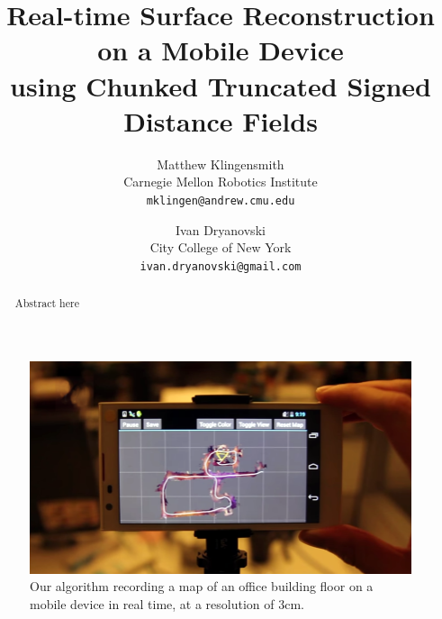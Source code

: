 \documentclass[conference,10pt]{IEEEtran}
\title{\Large Real-time Surface Reconstruction on a Mobile Device \\
using Chunked Truncated Signed Distance Fields}
\begin{document}
\author
{
	Matthew Klingensmith \\
	Carnegie Mellon Robotics Institute\\
	\texttt{mklingen@andrew.cmu.edu}
	\and
	Ivan Dryanovski \\
	City College of New York\\
	\texttt{ivan.dryanovski@gmail.com}
}


\maketitle

\begin{figure}[t]
  \centering
    \includegraphics[width=1.0\columnwidth]{img/mapdevice}
      \caption{Our algorithm recording a map of an office building floor on a mobile
  device in real time, at a resolution of 3cm.}
  \label{fig:map_device}
\end{figure}


\begin{abstract}
Abstract here
\end{abstract}
\end{document}
